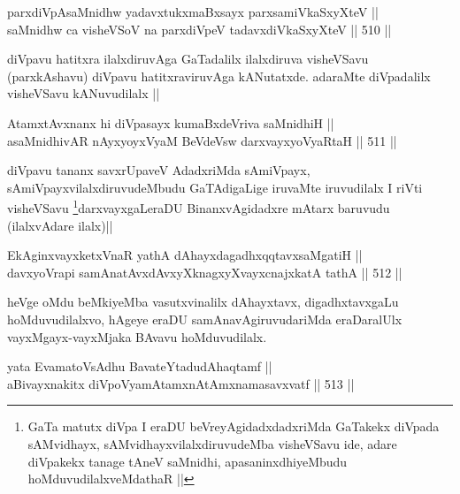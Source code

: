 
\begin{shl}
parxdiVpAsaMnidhw yadavxtukxmaBxsayx parxsamiVkaSxyXteV || \\
saMnidhw ca visheVSoV na parxdiVpeV tadavxdiVkaSxyXteV ||  510 || 
\end{shl}

\begin{artha}
diVpavu hatitxra ilalxdiruvAga GaTadalilx ilalxdiruva visheVSavu (parxkAshavu) diVpavu hatitxraviruvAga kANutatxde. adaraMte diVpadalilx visheVSavu kANuvudilalx ||
\end{artha}


\begin{shl}
AtamxtAvxnanx hi diVpasayx kumaBxdeVriva saMnidhiH || \\
asaMnidhivAR nAyxyoyxV\s yaM BeVdeV\s sw darxvayxyoVyaRtaH ||  511 ||  
\end{shl}

\begin{artha}
diVpavu tananx savxrUpaveV AdadxriMda sAmiVpayx, sAmiVpayxvilalxdiruvudeMbudu GaTAdigaLige iruvaMte iruvudilalx I riVti visheVSavu \footnote{GaTa matutx diVpa I eraDU beVreyAgidadxdadxriMda GaTakekx diVpada sAMvidhayx, sAMvidhayxvilalxdiruvudeMba visheVSavu ide, adare diVpakekx tanage tAneV saMnidhi, apasaninxdhiyeMbudu hoMduvudilalxveMdathaR ||}darxvayxgaLeraDU BinanxvAgidadxre mAtarx baruvudu (ilalxvAdare ilalx)||
\end{artha}


\begin{shl}
EkAginxvayxketxVnaR yathA dAhayxdagadhxqqtavxsaMgatiH || \\
davxyoVrapi samAnatAvxdAvxyXknagxyXvayxcnajxkatA tathA ||  512 ||  
\end{shl}

\begin{artha}
heVge oMdu beMkiyeMba vasutxvinalilx dAhayxtavx, digadhxtavxgaLu hoMduvudilalxvo, hAgeye eraDU samAnavAgiruvudariMda eraDaralUlx vayxMgayx-vayxMjaka BAvavu hoMduvudilalx. 
\end{artha}

\begin{shl}
yata EvamatoV\s sAdhu BavateYtadudAhaqtamf || \\
aBivayxnakitx diVpoV\s yamAtamxnA\s \s tAmxnamasavxvatf ||  513 ||  
\end{shl}

